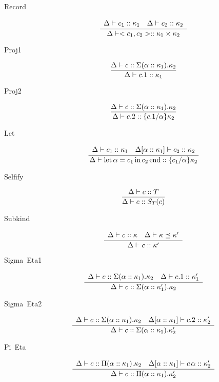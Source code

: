 \documentclass[12pt,twoside,fleqn]{amsart}
\theoremstyle{plain}
\theoremstyle{plain}
\theoremstyle{definition}
\begin{document}
\begin{description}
\item [Record]
\[
\frac{\begin{array}{ll}
\Delta  \vdash c_{1}  ::\kappa _{1}   & \Delta  \vdash c_{2}  ::\kappa _{2}  
\end{array} }{\Delta  \vdash <c_{1},c_{2}>  ::\kappa _{1} \times \kappa _{2}   }\]

\item [Proj1]
\[
\frac{\Delta  \vdash c  ::\Sigma (\alpha  ::\kappa _{1}  ).\kappa _{2}   }{\Delta  \vdash c.1  ::\kappa _{1}   }\]

\item [Proj2]
\[
\frac{\Delta  \vdash c  ::\Sigma (\alpha  ::\kappa _{1}  ).\kappa _{2}   }{\Delta  \vdash c.2  ::\{c.1 /\alpha  \}\kappa _{2}   }\]

\item [Let]
\[
\frac{\begin{array}{ll}
\Delta  \vdash c_{1}  ::\kappa _{1}   & \Delta  [\alpha   ::\kappa _{1}   ] \vdash c_{2} ::\kappa _{2} 
\end{array} }{\Delta  \vdash \mathrm{let}\, \alpha  =c_{1} \, \mathrm{in}\, c_{2} \, \mathrm{end}  ::\{c_{1} /\alpha  \}\kappa _{2}   }\]

\item [Selfify]
\[
\frac{\Delta  \vdash c  ::T  }{\Delta  \vdash c  ::S_{T}(c )  }\]

\item [Subkind]
\[
\frac{\begin{array}{ll}
\Delta  \vdash c  ::\kappa   & \Delta  \vdash \kappa   \preceq \kappa ' 
\end{array} }{\Delta  \vdash c  ::\kappa '  }\]

\item [Sigma~Eta1]
\[
\frac{\begin{array}{ll}
\Delta  \vdash c  ::\Sigma (\alpha  ::\kappa _{1}  ).\kappa _{2}   & \Delta  \vdash c.1  ::\kappa _{1} ' 
\end{array} }{\Delta  \vdash c  ::\Sigma (\alpha  ::\kappa _{1} ' ).\kappa _{2}   }\]

\item [Sigma~Eta2]
\[
\frac{\begin{array}{ll}
\Delta  \vdash c  ::\Sigma (\alpha  ::\kappa _{1}  ).\kappa _{2}   & \Delta  [\alpha   ::\kappa _{1}   ] \vdash c.2 ::\kappa _{2} '
\end{array} }{\Delta  \vdash c  ::\Sigma (\alpha  ::\kappa _{1}  ).\kappa _{2} '  }\]

\item [Pi~Eta]
\[
\frac{\begin{array}{ll}
\Delta  \vdash c  ::\Pi (\alpha  ::\kappa _{1}  ).\kappa _{2}   & \Delta  [\alpha   ::\kappa _{1}   ] \vdash c\, \alpha  ::\kappa _{2} '
\end{array} }{\Delta  \vdash c  ::\Pi (\alpha  ::\kappa _{1}  ).\kappa _{2} '  }\]

\end{description}
\end{document}
